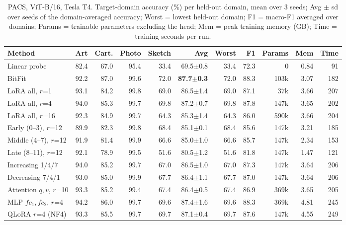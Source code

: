 \begin{table}[t]
\centering\small
\begin{tabular}{lrrrrrrrrrr}
\toprule
Method & Art & Cart. & Photo & Sketch & Avg & Worst & F1 & Params & Mem & Time \\
\midrule
Linear probe & 82.4 & 67.0 & 95.4 & 33.4 & 69.5$\pm$0.8 & 33.4 & 72.3 & 0 & 0.84 & 91 \\
BitFit & 92.2 & 87.0 & 99.6 & 72.0 & \textbf{87.7$\pm$0.3} & 72.0 & 88.3 & 103k & 3.07 & 182 \\
\midrule
LoRA all, $r$=1 & 93.1 & 84.2 & 99.8 & 69.0 & 86.5$\pm$1.4 & 69.0 & 87.1 & 37k & 3.66 & 207 \\
LoRA all, $r$=4 & 94.0 & 85.3 & 99.7 & 69.8 & 87.2$\pm$0.7 & 69.8 & 87.8 & 147k & 3.65 & 202 \\
LoRA all, $r$=16 & 92.3 & 84.9 & 99.7 & 64.3 & 85.3$\pm$1.4 & 64.3 & 86.0 & 590k & 3.66 & 204 \\
\midrule
Early (0--3), $r$=12 & 89.9 & 82.3 & 99.8 & 68.4 & 85.1$\pm$0.1 & 68.4 & 85.6 & 147k & 3.21 & 185 \\
Middle (4--7), $r$=12 & 91.9 & 81.4 & 99.9 & 66.6 & 85.0$\pm$1.0 & 66.6 & 85.7 & 147k & 2.34 & 153 \\
Late (8--11), $r$=12 & 92.1 & 78.9 & 99.5 & 51.6 & 80.5$\pm$1.2 & 51.6 & 81.8 & 147k & 1.47 & 121 \\
\midrule
Increasing 1/4/7 & 94.0 & 85.2 & 99.7 & 67.0 & 86.5$\pm$1.0 & 67.0 & 87.3 & 147k & 3.64 & 206 \\
Decreasing 7/4/1 & 93.0 & 85.0 & 99.9 & 67.7 & 86.4$\pm$1.1 & 67.7 & 87.0 & 147k & 3.64 & 206 \\
\midrule
Attention $q,v$, $r$=10 & 93.3 & 85.2 & 99.4 & 67.4 & 86.4$\pm$0.5 & 67.4 & 86.9 & 369k & 3.65 & 205 \\
MLP $fc_1,fc_2$, $r$=4 & 94.2 & 86.0 & 99.7 & 69.6 & 87.4$\pm$1.6 & 69.6 & 88.3 & 369k & 4.81 & 245 \\
\midrule
QLoRA $r$=4 (NF4) & 93.3 & 85.5 & 99.7 & 69.7 & 87.1$\pm$0.4 & 69.7 & 87.6 & 147k & 4.55 & 249 \\
\bottomrule
\end{tabular}
\caption{PACS, ViT-B/16, Tesla T4. Target-domain accuracy (\%) per held-out domain, mean over 3 seeds; Avg $\pm$ sd over seeds of the domain-averaged accuracy; Worst = lowest held-out domain; F1 = macro-F1 averaged over domains; Params = trainable parameters excluding the head; Mem = peak training memory (GB); Time = training seconds per run.}
\label{tab:pacs}
\end{table}
